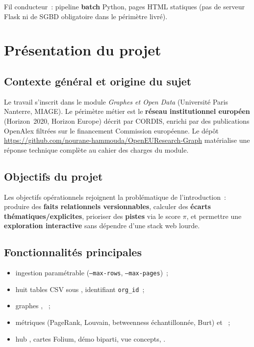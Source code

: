 \documentclass[12pt,a4paper,oneside]{article}
\newcommand{\githubproject}{\url{https://github.com/nourane-hammouda/OpenEUResearch-Graph}}
\begin{document}
\begin{insightbox}
Fil conducteur~: pipeline \textbf{batch} Python, pages HTML statiques (pas de serveur Flask ni de SGBD obligatoire dans le périmètre livré).
\end{insightbox}

\section{Présentation du projet}

\subsection{Contexte général et origine du sujet}
Le travail s'inscrit dans le module \emph{Graphes et Open Data} (Université Paris Nanterre, MIAGE). Le périmètre métier est le \textbf{réseau institutionnel européen} (Horizon~2020, Horizon Europe) décrit par CORDIS, enrichi par des publications OpenAlex filtrées sur le financement Commission européenne. Le dépôt \githubproject{} matérialise une réponse technique complète au cahier des charges du module.

\subsection{Objectifs du projet}
Les objectifs opérationnels rejoignent la problématique de l'introduction~: produire des \textbf{faits relationnels versionnables}, calculer des \textbf{écarts thématiques/explicites}, prioriser des \textbf{pistes} via le score $\pi$, et permettre une \textbf{exploration interactive} sans dépendre d'une stack web lourde.

\subsection{Fonctionnalités principales}
\begin{itemize}[nosep]
  \item ingestion paramétrable (\texttt{--max-rows}, \texttt{--max-pages})~;
  \item huit tables CSV sous , identifiant \texttt{org\_id}~;
  \item graphes , ~;
  \item métriques (PageRank, Louvain, betweenness échantillonnée, Burt) et ~;
  \item hub , cartes Folium, démo biparti, vue concepts, .
\end{itemize}
\end{document}
